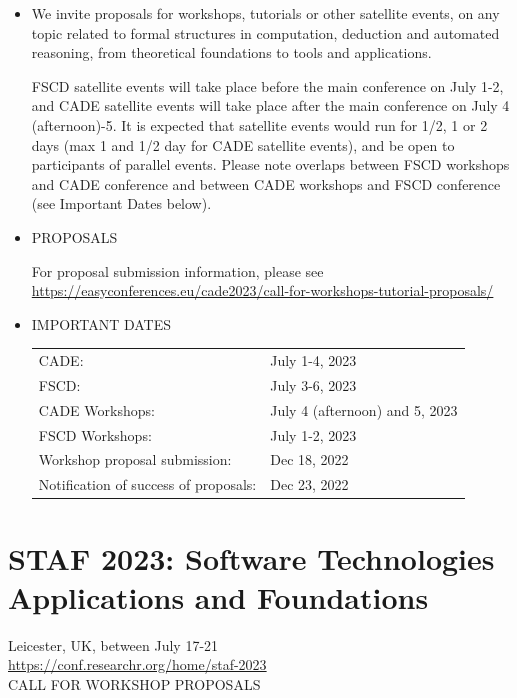 \documentclass[prodmode,acmtecs]{acmsmall} %
\begin{document}
\begin{itemize}\item  We invite proposals for workshops, tutorials or other satellite events, on any topic related to formal structures in computation, deduction and automated reasoning, from theoretical foundations to tools and applications. 
 
  FSCD satellite events will take place before the main conference on July 1-2, and CADE satellite events will take place after the main conference on July 4 (afternoon)-5. It is expected that satellite events would run for 1/2, 1 or 2 days (max 1 and 1/2 day for CADE satellite events), and be open to participants of parallel events. Please note overlaps between FSCD workshops and CADE conference and between CADE workshops and FSCD conference (see Important Dates below). 
 
\item  PROPOSALS 
 
  For proposal submission information, please see \href{https://easyconferences.eu/cade2023/call-for-workshops-tutorial-proposals/}{https://easyconferences.eu/cade2023/call-for-workshops-tutorial-proposals/} 
 
\item  IMPORTANT DATES 
 
\begin{tabulary}{\linewidth}{LL}CADE:  & July 1-4, 2023 \\
FSCD:  & July 3-6, 2023 \\
CADE Workshops:  & July 4 (afternoon) and 5, 2023 \\
FSCD Workshops:  & July 1-2, 2023 \\
Workshop proposal submission:  & Dec 18, 2022 \\
Notification of success of proposals:  & Dec 23, 2022 \\
\end{tabulary}
 
\end{itemize}\section{STAF 2023: Software Technologies Applications and Foundations }\label{STAF2023}  Leicester, UK, between July 17-21\\ 
  \href{https://conf.researchr.org/home/staf-2023}{https://conf.researchr.org/home/staf-2023}\\ 
CALL FOR WORKSHOP PROPOSALS 
\end{document}
